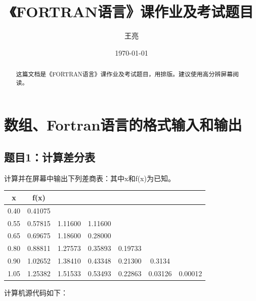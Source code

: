\documentclass[hyperref,UTF-8]{ctexart}
\title{\heiti 《FORTRAN语言》课作业及考试题目}
\author{\kaishu 王亮}
\date{\today}
\begin{document}
\maketitle
\tableofcontents
\begin{abstract}
这篇文档是《FORTRAN语言》课作业及考试题目，用\LaTeXe{}排版。建议使用高分辨屏幕阅读。
\end{abstract}
\section{数组、Fortran语言的格式输入和输出}
\subsection{题目1：计算差分表}
计算并在屏幕中输出下列差商表：其中x和f(x)为已知。
\begin{center}
\begin{tabular}{c|c|c|c|c|c|c}\hline
x&f(x)&&&&&\\\hline
0.40&0.41075&&&&&\\\hline
0.55&0.57815&1.11600&1.11600&&&\\\hline
0.65&0.69675&1.18600&0.28000&&&\\\hline
0.80&0.88811&1.27573&0.35893&0.19733&&\\\hline
0.90&1.02652&1.38410&0.43348&0.21300&0.3134& \\\hline
1.05&1.25382&1.51533&0.53493&0.22863&0.03126&0.00012 \\\hline
\end{tabular}
\end{center}

计算机源代码如下：
\end{document}
